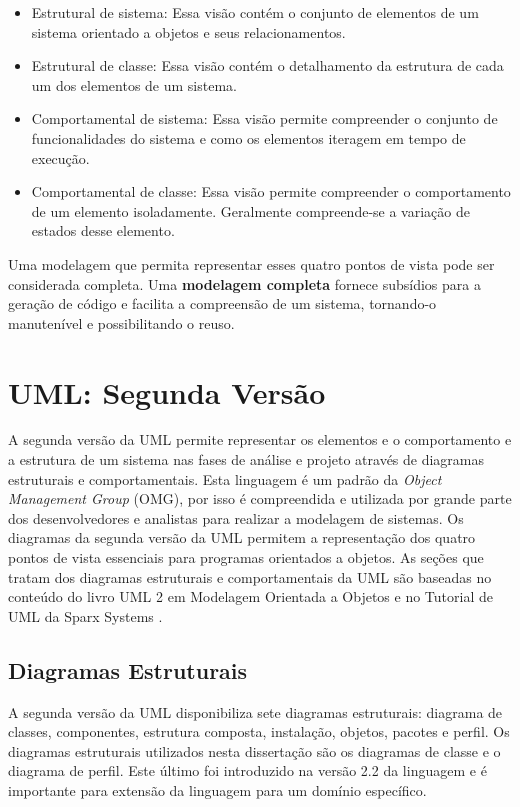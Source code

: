 \begin{itemize}
  \item Estrutural de sistema: Essa visão contém o conjunto de elementos de um
  sistema orientado a objetos e seus relacionamentos.
  \item Estrutural de classe: Essa visão contém o detalhamento da estrutura de
  cada um dos elementos de um sistema.
  \item Comportamental de sistema: Essa visão permite compreender o
  conjunto de funcionalidades do sistema e como os elementos iteragem em tempo
  de execução.
  \item Comportamental de classe: Essa visão permite compreender o comportamento
  de um elemento isoladamente. Geralmente compreende-se a variação de estados
  desse elemento.
\end{itemize}
  
Uma modelagem que permita representar esses quatro pontos de vista pode ser considerada completa. Uma \textbf{modelagem completa} fornece subsídios
para a geração de código e facilita a compreensão de um sistema, tornando-o manutenível e possibilitando o reuso. 

\section{UML: Segunda Versão}

A segunda versão da UML \cite{uml:05} permite representar os elementos e o comportamento e a estrutura de um sistema nas fases de análise e projeto
através de diagramas estruturais e comportamentais. Esta linguagem é um padrão da \textit{Object Management Group} (OMG), por isso é compreendida e
utilizada por grande parte dos desenvolvedores e analistas para realizar a modelagem de sistemas. Os diagramas da segunda versão da UML permitem a
representação dos quatro pontos de vista essenciais para programas  orientados a objetos. As seções que tratam dos diagramas estruturais e
comportamentais da UML são baseadas no conteúdo do livro UML 2 em Modelagem Orientada a Objetos \cite{uml2ricardo:03} e no Tutorial de UML da Sparx
Systems \cite{sparx_tutorial}.

\subsection{Diagramas Estruturais}

A segunda versão da UML disponibiliza sete diagramas estruturais: diagrama de classes, componentes, estrutura composta, instalação, objetos,
pacotes e perfil. Os diagramas estruturais utilizados nesta dissertação são os diagramas de classe e o diagrama de perfil. Este último foi
introduzido na versão 2.2 da linguagem e é importante para extensão da linguagem para um domínio específico.

